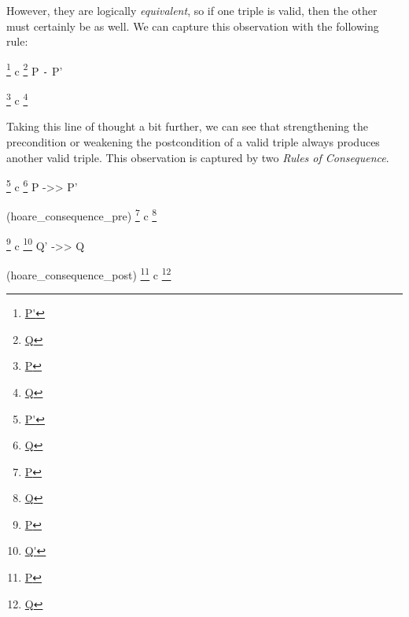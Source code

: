 \documentclass[12pt]{report}
\begin{document}
    However, they are logically \textit{equivalent}, so if one triple is
    valid, then the other must certainly be as well.  We can capture
    this observation with the following rule:


                \footnote{\url{P'}} c \footnote{\url{Q}}
                  P \texttt{-} P'
\par
\noindent\hrulefill\par
\noindent{}
                \footnote{\url{P}} c \footnote{\url{Q}}


 Taking this line of thought a bit further, we can see that
    strengthening the precondition or weakening the postcondition of a
    valid triple always produces another valid triple. This
    observation is captured by two \textit{Rules of Consequence}.


                \footnote{\url{P'}} c \footnote{\url{Q}}
                   P ->> P'
\par
\noindent\hrulefill\par
\noindent{}   (hoare\_consequence\_pre)
                \footnote{\url{P}} c \footnote{\url{Q}}


                \footnote{\url{P}} c \footnote{\url{Q'}}
                  Q' ->> Q
\par
\noindent\hrulefill\par
\noindent{}    (hoare\_consequence\_post)
                \footnote{\url{P}} c \footnote{\url{Q}}
\end{document}
